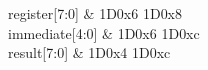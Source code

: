 \begin{tikztimingtable} [xscale=2.0]
	register[7:0] & 1D{0x6} 1D{0x8} \\
	immediate[4:0] & 1D{0x6} 1D{0xc} \\
	result[7:0] & 1D{0x4} 1D{0xc} \\
\end{tikztimingtable}
